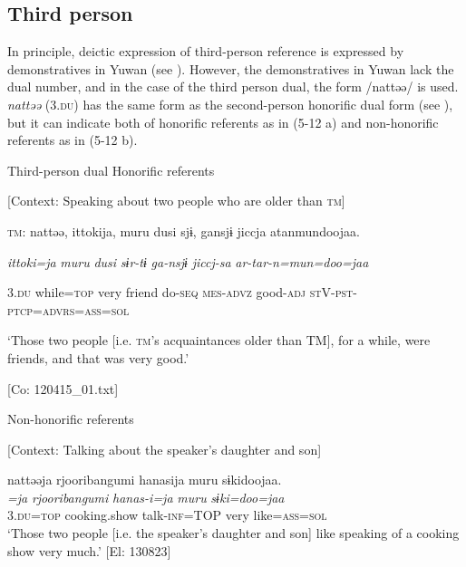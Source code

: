 \subsection{Third person} \label{sec:5.1.3}

In principle, deictic expression of third-person reference is expressed by demonstratives in Yuwan (see ). However, the demonstratives in Yuwan lack the dual number, and in the case of the third person dual, the form /nattəə/ is used. \textit{nattəə} (3.\textsc{du}) has the same form as the second-person honorific dual form (see ), but it can indicate both of honorific referents as in (5-12 a) and non-honorific referents as in (5-12 b).

\ea \label{ex:5:12}   Third-person dual
  \ea Honorific referents

  [Context: Speaking about two people who are older than \textsc{tm}]

  \textsc{tm}:  nattəə,  {\textbar}ittoki{\textbar}ja,  muru  dusi  sjɨ,  gansjɨ  jiccja atanmundoojaa.
                                                                                                                            
    \textit{}  \textit{ittoki=ja}  \textit{muru}  \textit{dusi}  \textit{sɨr-tɨ}  \textit{ga-nsjɨ}  \textit{jiccj-sa} \textit{ar-tar-n=mun=doo=jaa}
                                                                                                                            
    3.\textsc{du}  while=\textsc{top}  very  friend  do-\textsc{seq}  \textsc{mes}-\textsc{advz}  good-\textsc{adj}  \textsc{st}V-\textsc{pst}-\textsc{ptcp}=\textsc{advrs}=\textsc{ass}=\textsc{sol}
    
    ‘Those two people [i.e. \textsc{tm}’s acquaintances older than TM], for a while, were friends, and that was very good.’

    [Co: 120415\_01.txt]

  \ex Non-honorific referents

  [Context: Talking about the speaker’s daughter and son]

\glll  nattəəja  {\textbar}rjooribangumi{\textbar}  hanasija  muru  sɨkidoojaa.\\
\textit{=ja}  \textit{rjooribangumi}  \textit{hanas-i=ja}  \textit{muru}  \textit{sɨki=doo=jaa}\\
3.\textsc{du}=\textsc{top}  cooking.show  talk-\textsc{inf}=TOP  very  like=\textsc{ass}=\textsc{sol}\\
\glt ‘Those two people [i.e. the speaker’s daughter and son] like speaking of a cooking show very much.’ [El: 130823]
\z
\z

